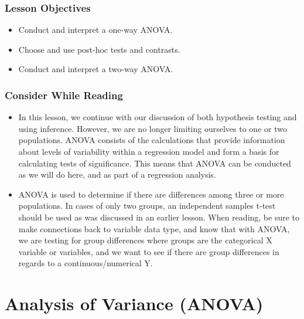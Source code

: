\documentclass[
  letterpaper,
  DIV=11,
  numbers=noendperiod]{scrreprt}
\providecommand{\tightlist}{%
  \setlength{\itemsep}{0pt}\setlength{\parskip}{0pt}}\usepackage{longtable,booktabs,array}
\begin{document}
\subsection{Lesson Objectives}\label{lesson-objectives-5}

\begin{itemize}
\tightlist
\item
  Conduct and interpret a one-way ANOVA.
\item
  Choose and use post-hoc tests and contrasts.
\item
  Conduct and interpret a two-way ANOVA.
\end{itemize}

\subsection{Consider While Reading}\label{consider-while-reading-5}

\begin{itemize}
\tightlist
\item
  In this lesson, we continue with our discussion of both hypothesis
  testing and using inference. However, we are no longer limiting
  ourselves to one or two populations. ANOVA consists of the
  calculations that provide information about levels of variability
  within a regression model and form a basis for calculating tests of
  significance. This means that ANOVA can be conducted as we will do
  here, and as part of a regression analysis.
\item
  ANOVA is used to determine if there are differences among three or
  more populations. In cases of only two groups, an independent samples
  t-test should be used as was discussed in an earlier lesson. When
  reading, be sure to make connections back to variable data type, and
  know that with ANOVA, we are testing for group differences where
  groups are the categorical X variable or variables, and we want to see
  if there are group differences in regards to a continuous/numerical Y.
\end{itemize}


\chapter{Analysis of Variance (ANOVA)}\label{analysis-of-variance-anova}
\end{document}
